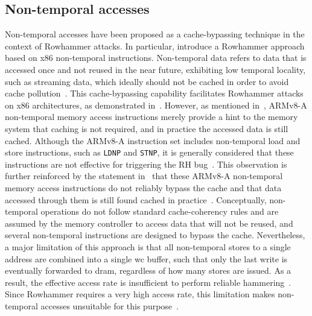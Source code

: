     \subsection{Non-temporal accesses} \label{subsec:non-temporal-accesses}
        Non-temporal accesses have been proposed as a cache-bypassing technique in the context of Rowhammer 
        attacks. In particular, \cite{paperANewApproach} introduce a Rowhammer approach based on x86 non-temporal instructions. 
        Non-temporal data refers to data that is accessed once and not reused in the near future, exhibiting 
        low temporal locality, such as streaming data, which ideally should not be cached in order to avoid 
        cache pollution~\cite{paperTriggeringRHHardwareFault}. This cache-bypassing capability facilitates Rowhammer 
        attacks on x86 architectures, as demonstrated in~\cite{paperANewApproach}. However, as mentioned in~\cite{paperDrammer, paperTriggeringRHHardwareFault, datasheetARMReferenceManual}, ARMv8-A 
        non-temporal memory access instructions merely provide a hint to the memory system that caching is 
        not required, and in practice the accessed data is still cached. Although the ARMv8-A instruction set 
        includes non-temporal load and store instructions, such as \texttt{LDNP} and \texttt{STNP}, it is generally considered 
        that these instructions are not effective for triggering the RH bug~\cite{paperTriggeringRHHardwareFault}. This 
        observation is further reinforced by the statement in~\cite{paperDrammer} that these ARMv8-A non-temporal memory 
        access instructions do not reliably bypass the cache and that data accessed through them is still found 
        cached in practice~\cite{paperTriggeringRHHardwareFault}. Conceptually, non-temporal operations do not follow 
        standard cache-coherency rules and are assumed by the memory controller to access data that will not 
        be reused, and several non-temporal instructions are designed to bypass the cache. Nevertheless, a 
        major limitation of this approach is that all non-temporal stores to a single address are combined 
        into a single \gls{wc} buffer, such that only the last write is eventually forwarded to 
        \gls{dram}, regardless of how many stores are issued. As a result, the effective access rate is insufficient 
        to perform reliable hammering~\cite{toolRowhammering}. Since Rowhammer requires a very high access rate, this limitation 
        makes non-temporal accesses unsuitable for this purpose~\cite{toolRPI3}.
    
